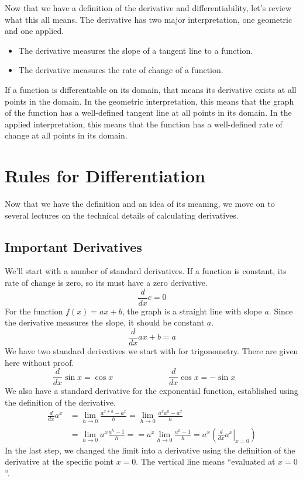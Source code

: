 \documentclass[fleqn]{report}
\begin{document}
Now that we have a definition of the derivative and
differentiability, let's review what this all means. The
derivative has two major interpretation, one geometric and one
applied. 
\begin{itemize}
\item The derivative measures the slope of a tangent line to a
function.
\item The derivative measures the rate of change of a function.
\end{itemize}
If a function is differentiable on its domain, that means its
derivative exists at all points in the domain. In the
geometric interpretation, this means that the graph of the
function has a well-defined tangent line at all points in its
domain. In the applied interpretation, this means that the
function has a well-defined rate of change at all points in
its domain.

\section{Rules for Differentiation}
\label{derivative-rules}

Now that we have the definition and an idea of its meaning, we
move on to several lectures on the technical details of
calculating derivatives. 

\subsection{Important Derivatives}
\label{important-derivatives}

We'll start with a number of standard derivatives. If a
function is constant, its rate of change is zero, so its must
have a zero derivative. 
\begin{equation*}
\frac{d}{dx} c = 0
\end{equation*}
For the function $f(x) = ax + b$, the graph is a straight line
with slope $a$. Since the derivative measures the slope, it
should be constant $a$.
\begin{equation*}
\frac{d}{dx} ax + b = a
\end{equation*}
We have two standard derivatives we start with for
trigonometry. There are given here without proof.
\begin{equation*}
\frac{d}{dx} \sin x = \cos x \quad \quad \hspace{2cm}
\frac{d}{dx} \cos x = -\sin x \quad \quad 
\end{equation*}
We also have a standard derivative for the exponential
function, established  using the definition of the
derivative.
\begin{align*}
\frac{d}{dx} a^x & = \lim_{h \rightarrow 0} \frac{a^{x+h} -
a^x}{h} = \lim_{h \rightarrow 0} \frac{a^x a^h - a^x}{h} \\
& = \lim_{h \rightarrow 0} a^x \frac{a^h-1}{h} = 
= a^x \lim_{h \rightarrow 0} \frac{a^h-1}{h} = 
a^x \left( \left. \frac{d}{dx} a^x \right|_{x=0} \right) 
\end{align*}
In the last step, we changed the limit into a derivative using
the definition of the derivative at the specific point $x=0$.
The vertical line means ``evaluated at $x=0$''. 
\end{document}
